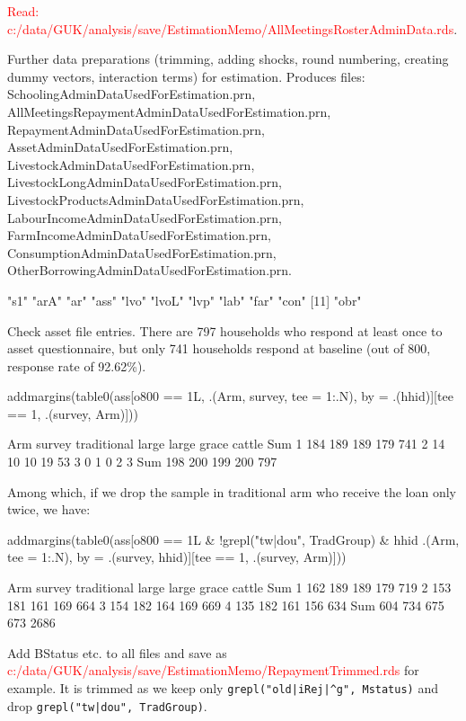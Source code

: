  \textcolor{red}{Read: c:/data/GUK/analysis/save/EstimationMemo/AllMeetingsRosterAdminData.rds}.

Further data preparations (trimming, adding shocks, round numbering, creating dummy vectors, interaction terms) for estimation. Produces files: \textsf{\footnotesize SchoolingAdminDataUsedForEstimation.prn, AllMeetingsRepaymentAdminDataUsedForEstimation.prn, RepaymentAdminDataUsedForEstimation.prn, AssetAdminDataUsedForEstimation.prn, LivestockAdminDataUsedForEstimation.prn, LivestockLongAdminDataUsedForEstimation.prn, LivestockProductsAdminDataUsedForEstimation.prn, LabourIncomeAdminDataUsedForEstimation.prn, FarmIncomeAdminDataUsedForEstimation.prn, ConsumptionAdminDataUsedForEstimation.prn, OtherBorrowingAdminDataUsedForEstimation.prn}.
\begin{Schunk}
\begin{Soutput}
 [1] "s1"   "arA"  "ar"   "ass"  "lvo"  "lvoL" "lvp"  "lab"  "far"  "con" 
[11] "obr" 
\end{Soutput}
\end{Schunk}
Check asset file entries. There are 797 households who respond at least once to asset questionnaire, but only
741 households respond at baseline (out of 800, response rate of 92.62\%).
\begin{Schunk}
\begin{Sinput}
addmargins(table0(ass[o800 == 1L, .(Arm, survey, tee = 1:.N), 
  by = .(hhid)][tee == 1, .(survey, Arm)]))
\end{Sinput}
\begin{Soutput}
      Arm
survey traditional large large grace cattle Sum
   1           184   189         189    179 741
   2            14    10          10     19  53
   3             0     1           0      2   3
   Sum         198   200         199    200 797
\end{Soutput}
\end{Schunk}
Among which, if we drop the sample in \textsf{traditional} arm who receive the loan only twice, we have:
\begin{Schunk}
\begin{Sinput}
addmargins(table0(ass[o800 == 1L & !grepl("tw|dou", TradGroup) & 
  hhid %in% hhid[survey==1], 
  .(Arm, tee = 1:.N), by = .(survey, hhid)][tee == 1, .(survey, Arm)]))
\end{Sinput}
\begin{Soutput}
      Arm
survey traditional large large grace cattle  Sum
   1           162   189         189    179  719
   2           153   181         161    169  664
   3           154   182         164    169  669
   4           135   182         161    156  634
   Sum         604   734         675    673 2686
\end{Soutput}
\end{Schunk}
Add \textsf{BStatus} etc. to all files and save as \textcolor{red}{c:/data/GUK/analysis/save/EstimationMemo/RepaymentTrimmed.rds} for example. It is trimmed as we keep only \verb+grepl("old|iRej|^g", Mstatus)+ and drop \verb+grepl("tw|dou", TradGroup)+.

